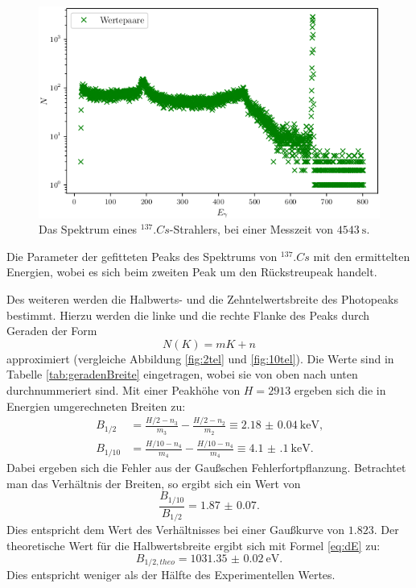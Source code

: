 \begin{figure}
	\centering
	\includegraphics[width=\linewidth-70pt,height=\textheight-70pt,keepaspectratio]{content/images/Cs137.png}
	\caption{Das Spektrum eines $^{137}.{Cs}$-Strahlers, bei einer Messzeit von $\SI{4543}{\second}$.}
	\label{fig:SpektrumCs}
\end{figure}

\begin{table}
	\centering
	\caption{Die Parameter der gefitteten Peaks des Spektrums von $^{137}.{Cs}$ mit den ermittelten Energien, wobei es sich beim zweiten Peak um den Rückstreupeak handelt.}
	
	\label{tab:parameterCs}
\end{table}

\noindent Des weiteren werden die Halbwerts- und die Zehntelwertsbreite des Photopeaks bestimmt. Hierzu werden die linke und die rechte Flanke des Peaks durch Geraden der Form 
\begin{equation}
N(K) = mK+n	\label{eq:Gerade}
\end{equation}
approximiert (vergleiche Abbildung \ref{fig:2tel} und \ref{fig:10tel}). Die Werte sind in Tabelle \ref{tab:geradenBreite} eingetragen, wobei sie von oben nach unten durchnummeriert sind. Mit einer Peakhöhe von $H=2913$ ergeben sich die in Energien umgerechneten Breiten zu:
\begin{align*}
B_{1/2} &= \frac{H/2-n_3}{m_3}-\frac{H/2-n_2}{m_2} \equiv \SI{2.18(4)}{\kilo\electronvolt}\text{,}\\
B_{1/10} &= \frac{H/10-n_4}{m_4}-\frac{H/10-n_4}{m_4} \equiv \SI{4.1(1)}{\kilo\electronvolt}\text{.}
\end{align*}
Dabei ergeben sich die Fehler aus der Gaußschen Fehlerfortpflanzung.
Betrachtet man das Verhältnis der Breiten, so ergibt sich ein Wert von 
\[
\frac{B_{1/10}}{B_{1/2}} = \num{1.87(7)}\text{.}
\]
Dies entspricht dem Wert des Verhältnisses bei einer Gaußkurve von $\num{1.823}$.
Der theoretische Wert für die Halbwertsbreite ergibt sich mit Formel \eqref{eq:dE} zu:
\[
B_{1/2,theo} = \SI{1031.35(2)}{\electronvolt}\text{.}
\]
Dies entspricht weniger als der Hälfte des Experimentellen Wertes.

